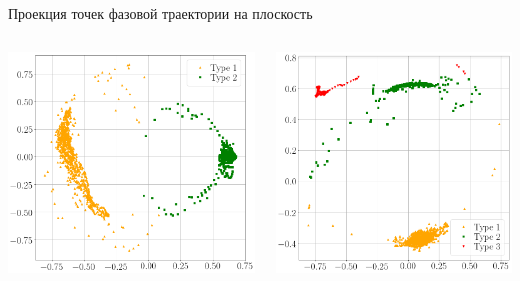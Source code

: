 \documentclass[10pt,pdf,hyperref={unicode}]{beamer}
\begin{document}
\begin{frame}[shrink=5]{Проекция точек фазовой траектории на плоскость}
\justifying

\begin{columns}
    \begin{column}{0.35\textwidth}
        \includegraphics[width=1\textwidth]{results/2_patern_2_2D_vector}
    \end{column}
    \begin{column}{0.35\textwidth}
        \includegraphics[width=1\textwidth]{results/3_patern_2_2D_vector}
    \end{column}
\end{columns}


\end{frame}
\end{document}
